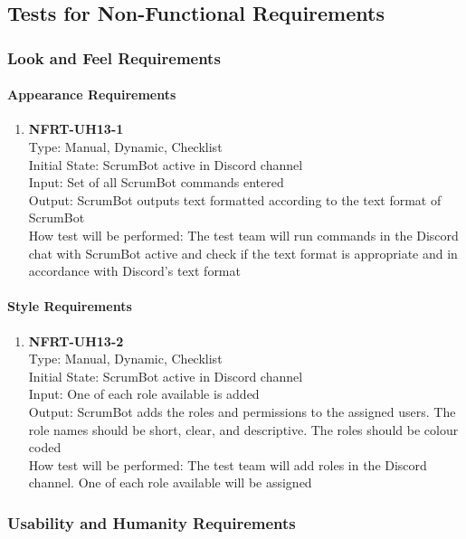 \documentclass[12pt, titlepage]{article}
\begin{document}
\subsection{Tests for Non-Functional Requirements}

\subsubsection{Look and Feel Requirements}
\paragraph{Appearance Requirements}
\begin{enumerate}
\item{\textbf{NFRT-UH13-1}}\\
Type: Manual, Dynamic, Checklist\\
Initial State: ScrumBot active in Discord channel\\
Input: Set of all ScrumBot commands entered\\
Output: ScrumBot outputs text formatted according to the text format of ScrumBot\\
How test will be performed: The test team will run commands in the Discord chat with ScrumBot active and check if the text format is appropriate and in accordance with Discord's text format
\end{enumerate}

\paragraph{Style Requirements}
\begin{enumerate}
\item{\textbf{NFRT-UH13-2}}\\
Type: Manual, Dynamic, Checklist\\
Initial State: ScrumBot active in Discord channel\\
Input: One of each role available is added\\
Output: ScrumBot adds the roles and permissions to the assigned users. The role names should be short, clear, and descriptive. The roles should be colour coded\\
How test will be performed: The test team will add roles in the Discord channel. One of each role available will be assigned
\end{enumerate}

\subsubsection{Usability and Humanity Requirements}
\end{document}
